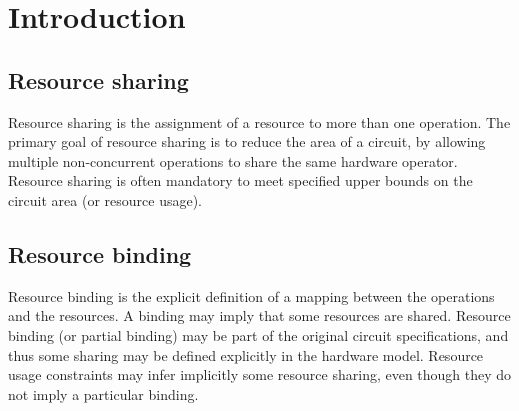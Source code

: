 \section{Introduction}

\subsection{Resource sharing}
Resource sharing is the assignment of a resource to more than one operation. The 
primary goal of resource sharing is to reduce the area of a circuit, by allowing multiple 
non-concurrent operations to share the same hardware operator. Resource sharing is 
often mandatory to meet specified upper bounds on the circuit area (or resource usage)\cite{b1}.

\subsection{Resource binding}
Resource binding is the explicit definition of a mapping between the operations 
and the resources. A binding may imply that some resources are shared. Resource 
binding (or partial binding) may be part of the original circuit specifications, and 
thus some sharing may be defined explicitly in the hardware model. Resource usage 
constraints may infer implicitly some resource sharing, even though they do not imply 
a particular binding\cite{b1}. 


